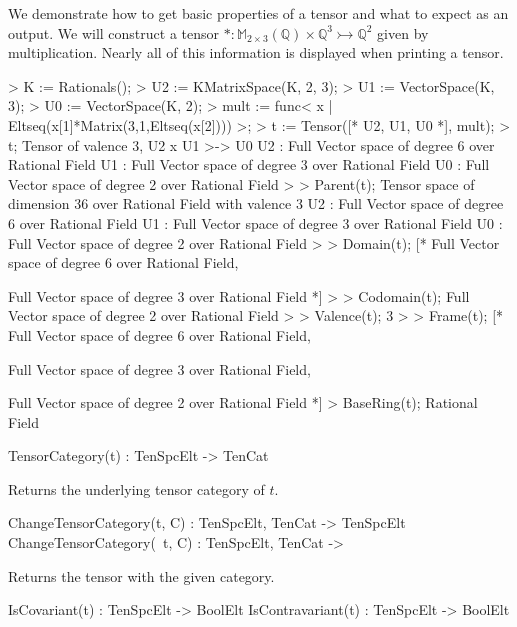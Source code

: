 \begin{example}[BasicProps]

We demonstrate how to get basic properties of a tensor and what to expect as an
output. We will construct a tensor $*:\mathbb{M}_{2\times 3}(\mathbb{Q})\times
\mathbb{Q}^3\rightarrowtail \mathbb{Q}^2$ given by multiplication. Nearly all of
this information is displayed when printing a tensor.
\begin{code}
> K := Rationals();
> U2 := KMatrixSpace(K, 2, 3);
> U1 := VectorSpace(K, 3);
> U0 := VectorSpace(K, 2);
> mult := func< x | Eltseq(x[1]*Matrix(3,1,Eltseq(x[2]))) >;
> t := Tensor([* U2, U1, U0 *], mult);
> t;
Tensor of valence 3, U2 x U1 >-> U0
U2 : Full Vector space of degree 6 over Rational Field
U1 : Full Vector space of degree 3 over Rational Field
U0 : Full Vector space of degree 2 over Rational Field
> 
> Parent(t);
Tensor space of dimension 36 over Rational Field with valence 3
U2 : Full Vector space of degree 6 over Rational Field
U1 : Full Vector space of degree 3 over Rational Field
U0 : Full Vector space of degree 2 over Rational Field
> 
> Domain(t);
[*
    Full Vector space of degree 6 over Rational Field,

    Full Vector space of degree 3 over Rational Field
*]
> 
> Codomain(t);
Full Vector space of degree 2 over Rational Field
> 
> Valence(t);
3
> 
> Frame(t);
[*
    Full Vector space of degree 6 over Rational Field,

    Full Vector space of degree 3 over Rational Field,

    Full Vector space of degree 2 over Rational Field
*]
> BaseRing(t);
Rational Field
\end{code}
\end{example}

\begin{intrinsics}
TensorCategory(t) : TenSpcElt -> TenCat
\end{intrinsics}

Returns the underlying tensor category of $t$.

\begin{intrinsics}
ChangeTensorCategory(t, C) : TenSpcElt, TenCat -> TenSpcElt
ChangeTensorCategory(~t, C) : TenSpcElt, TenCat -> 
\end{intrinsics}

Returns the tensor with the given category.

\begin{intrinsics}
IsCovariant(t) : TenSpcElt -> BoolElt
IsContravariant(t) : TenSpcElt -> BoolElt
\end{intrinsics}

